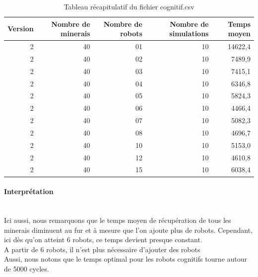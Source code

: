 \begin{table}[!h]
	\begin{center}
		\begin{tabular}{|r|r|r|r|r|}
			\hline
			Version & Nombre de minerais & Nombre de robots & Nombre de simulations & Temps moyen \\
			\hline
			2 &	40 & 01 & 10 & 14622,4\\
			2 &	40 & 02 & 10 &  7489,9\\
			2 & 40 & 03 & 10 &  7415,1\\
			2 &	40 & 04	& 10 &  6346,8\\
			2 &	40 & 05	& 10 &  5824,3\\
			2 &	40 & 06	& 10 &  4466,4\\
			2 &	40 & 07	& 10 &  5082,3\\
			2 &	40 & 08	& 10 &  4696,7\\
			2 &	40 & 10	& 10 &  5153,0\\
			2 &	40 & 12	& 10 &  4610,8\\
			2 &	40 & 15	& 10 &  6038,4\\
			\hline
		\end{tabular}
	\end{center}
	\caption{Tableau récapitulatif du fichier cognitif.csv}
\end{table}


\begin{center}
\end{center}

\paragraph*{Interprétation}
~\\
Ici aussi, nous remarquons que le temps moyen de récupération de tous les minerais diminuent au fur et à mesure que l'on ajoute plus de robots. Cependant, ici dès qu'on atteint 6 robots, ce temps devient presque constant.\\
A partir de 6 robots, il n'est plus nécessaire d'ajouter des robots\\ Aussi, nous notons que le temps optimal pour les robots cognitifs tourne autour de 5000 cycles.
\hskip7mm


